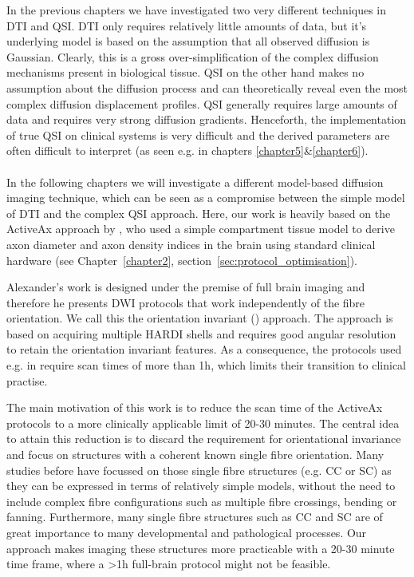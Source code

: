 In the previous chapters we have investigated two very different techniques in \gls{DTI} and \gls{QSI}. \gls{DTI} only requires relatively little amounts of data, but it's underlying model is based on the assumption that all observed diffusion is Gaussian. Clearly, this is a gross over-simplification of the complex diffusion mechanisms present in biological tissue. \gls{QSI} on the other hand makes no assumption about the diffusion process and can theoretically reveal even the most complex diffusion displacement profiles. \gls{QSI} generally requires large amounts of data and requires very strong diffusion gradients. Henceforth, the implementation of true \gls{QSI} on clinical systems is very difficult and the derived parameters are often difficult to interpret (as seen e.g. in chapters \ref{chapter5}\&\ref{chapter6}).
\paragraph{}
In the following chapters we will investigate a different model-based diffusion imaging technique, which can be seen as a compromise between the simple model of \gls{DTI} and the complex \gls{QSI} approach. Here, our work is heavily based on the ActiveAx approach by \citet{Alexander:2008}, who used a simple compartment tissue model to derive axon diameter and axon density indices in the brain using standard clinical hardware (see Chapter~\ref{chapter2}, section~\ref{sec:protocol_optimisation}).


Alexander's work is designed under the premise of full brain imaging and therefore he presents DWI protocols that work independently of the fibre orientation. We call this the orientation invariant ({\OI}) approach. The {\OI} approach is based on acquiring multiple HARDI shells and requires good angular resolution to retain the orientation invariant features. As a consequence, the {\OI} protocols used e.g. in \citep{Alexander:2010} require scan times of more than 1h, which limits their transition to clinical practise.


The main motivation of this work is to reduce the scan time of the ActiveAx protocols to a more clinically applicable limit of 20-30 minutes. The central idea to attain this reduction is to discard the requirement for orientational invariance and focus on structures with a coherent known single fibre orientation. Many studies before have focussed on those single fibre structures (e.g. \gls{CC} or \gls{SC}) as they can be expressed in terms of relatively simple models, without the need to include complex fibre configurations such as multiple fibre crossings, bending or fanning. Furthermore, many single fibre structures such as \gls{CC} and \gls{SC} are of great importance to many developmental and pathological processes. Our approach makes imaging these structures more practicable with a 20-30 minute time frame, where a >1h full-brain protocol might not be feasible.
